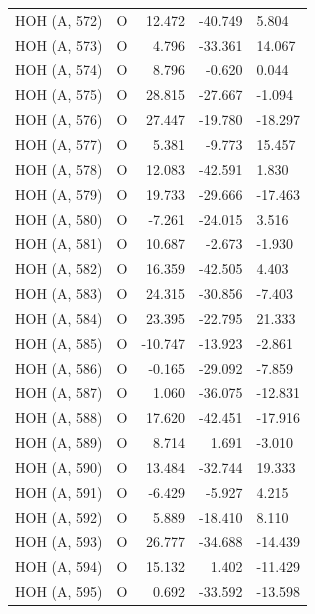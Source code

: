 \begin{longtable}{@{}lcrr@{}}
  \cmidrule(r){1-5}
  HOH (A, 572) & O & 12.472 & -40.749 & 5.804 \\
  \cmidrule(r){1-5}
  HOH (A, 573) & O & 4.796 & -33.361 & 14.067 \\
  \cmidrule(r){1-5}
  HOH (A, 574) & O & 8.796 & -0.620 & 0.044 \\
  \cmidrule(r){1-5}
  HOH (A, 575) & O & 28.815 & -27.667 & -1.094 \\
  \cmidrule(r){1-5}
  HOH (A, 576) & O & 27.447 & -19.780 & -18.297 \\
  \cmidrule(r){1-5}
  HOH (A, 577) & O & 5.381 & -9.773 & 15.457 \\
  \cmidrule(r){1-5}
  HOH (A, 578) & O & 12.083 & -42.591 & 1.830 \\
  \cmidrule(r){1-5}
  HOH (A, 579) & O & 19.733 & -29.666 & -17.463 \\
  \cmidrule(r){1-5}
  HOH (A, 580) & O & -7.261 & -24.015 & 3.516 \\
  \cmidrule(r){1-5}
  HOH (A, 581) & O & 10.687 & -2.673 & -1.930 \\
  \cmidrule(r){1-5}
  HOH (A, 582) & O & 16.359 & -42.505 & 4.403 \\
  \cmidrule(r){1-5}
  HOH (A, 583) & O & 24.315 & -30.856 & -7.403 \\
  \cmidrule(r){1-5}
  HOH (A, 584) & O & 23.395 & -22.795 & 21.333 \\
  \cmidrule(r){1-5}
  HOH (A, 585) & O & -10.747 & -13.923 & -2.861 \\
  \cmidrule(r){1-5}
  HOH (A, 586) & O & -0.165 & -29.092 & -7.859 \\
  \cmidrule(r){1-5}
  HOH (A, 587) & O & 1.060 & -36.075 & -12.831 \\
  \cmidrule(r){1-5}
  HOH (A, 588) & O & 17.620 & -42.451 & -17.916 \\
  \cmidrule(r){1-5}
  HOH (A, 589) & O & 8.714 & 1.691 & -3.010 \\
  \cmidrule(r){1-5}
  HOH (A, 590) & O & 13.484 & -32.744 & 19.333 \\
  \cmidrule(r){1-5}
  HOH (A, 591) & O & -6.429 & -5.927 & 4.215 \\
  \cmidrule(r){1-5}
  HOH (A, 592) & O & 5.889 & -18.410 & 8.110 \\
  \cmidrule(r){1-5}
  HOH (A, 593) & O & 26.777 & -34.688 & -14.439 \\
  \cmidrule(r){1-5}
  HOH (A, 594) & O & 15.132 & 1.402 & -11.429 \\
  \cmidrule(r){1-5}
  HOH (A, 595) & O & 0.692 & -33.592 & -13.598 \\

\end{longtable}
